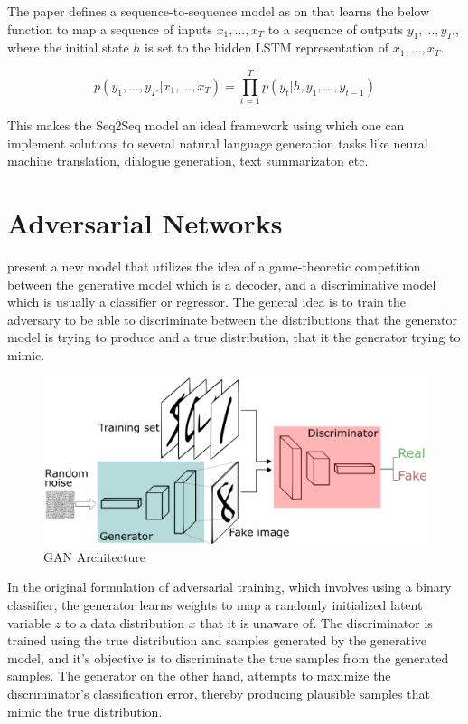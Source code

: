 The paper defines a sequence-to-sequence model as on that learns the below function to map a sequence of inputs $x_1, ... , x_T$ to a sequence of outputs $y_1, ... , y_{T′}$, where the initial state $h$ is set to the hidden LSTM representation of $x_1, ... , x_T$.

\begin{equation}
	p(y_1, ... , y_{T′} | x_1, ... , x_T) =	\prod_{t=1}^T p(y_t | h, y_1, ... , y_{t−1})
\end{equation}

This makes the Seq2Seq model an ideal framework using which one can implement solutions to several natural language generation tasks like neural machine translation, dialogue generation, text summarizaton etc.

\section{Adversarial Networks}

\cite{goodfellow2014generative} present a new model that utilizes the idea of a game-theoretic competition between the generative model which is a decoder, and a discriminative model which is usually a classifier or regressor. The general idea is to train the adversary to be able to discriminate between the distributions that the generator model is trying to produce and a true distribution, that it the generator trying to mimic.

\begin{figure}[ht]
	\centering
	\includegraphics[width=\textwidth]{images/gans}
	\caption{\label{fig:gans} GAN Architecture}
\end{figure}

In the original formulation of adversarial training, which involves using a binary classifier, the generator learns weights to map a randomly initialized latent variable $z$ to a data distribution $x$ that it is unaware of. The discriminator is trained using the true distribution and samples generated by the generative model, and it's objective is to discriminate the true samples from the generated samples. The generator on the other hand, attempts to maximize the discriminator's classification error, thereby producing plausible samples that mimic the true distribution.

